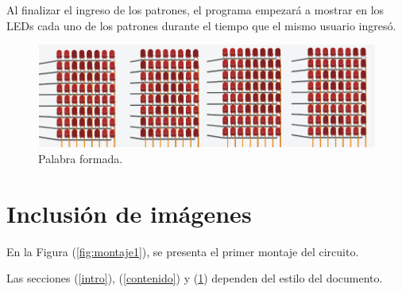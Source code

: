 \documentclass{article}
\begin{document}
\begin{enumerate}
\newline 
Al finalizar el ingreso de los patrones, el programa empezará a mostrar en los LEDs cada uno de los patrones durante el tiempo que el mismo usuario ingresó. 

\newpage
\begin{figure}[h]
\includegraphics[scale=0.8]{palabra.png}
\centering
\caption{Palabra formada.}
\label{fig:palabra}
\end{figure}

\end{enumerate}


\section{Inclusión de imágenes} \label{imagenes}

En la Figura (\ref{fig:montaje1}), se presenta el primer montaje del circuito. 

Las secciones (\ref{intro}), (\ref{contenido}) y (\ref{imagenes}) dependen del estilo del documento.



\end{document}
